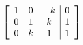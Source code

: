 \documentclass{article}
\begin{document}
	\begin{equation*}
		\left[
				\begin{array}{c c c | c}
				1 & 0 & -k & 0 \\
				0 & 1 & k & 1 \\
				0 & k & 1 & 1
			\end{array}
		\right]
	\end{equation*}
\end{document}
